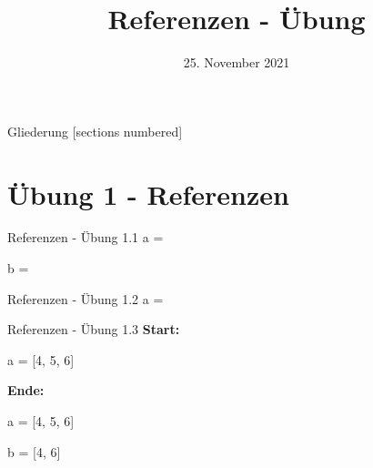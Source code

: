 



\title{Referenzen - Übung}
\date{25. November 2021}


\maketitle

\begin{frame}{Gliederung}
	[sections numbered]
	\tableofcontents
\end{frame}

\section{Übung 1 - Referenzen}
\begin{frame}{Referenzen - Übung 1.1}
	\large
	a = \only<1>{?}\only<2>{\alert{[ [1, 5], [1, 5] ]}}
	
	b = \only<2>{\alert{[1, 5]}}
\end{frame}


\begin{frame}{Referenzen - Übung 1.2}
	\large
	a = \only<2>{\alert{[2, 3]}}
\end{frame}

\begin{frame}{Referenzen - Übung 1.3}
	\only<1>{
		\large
		
		\large
	}
	\only<2>{
		\large
		
	}
	\textbf{Start:}
	
	a = [4, 5, 6]
	\linebreak
	
	\textbf{Ende:}
	
	a = [4, 5, 6]
	
	b = [4, 6]
\end{frame}

